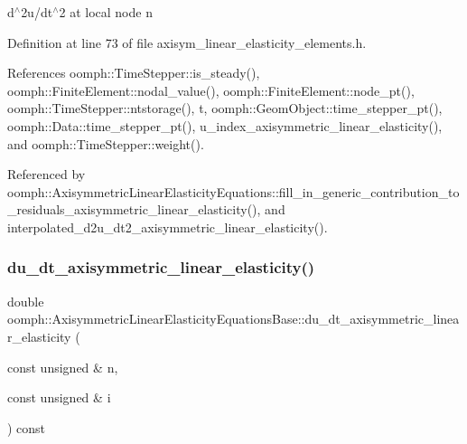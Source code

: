 d$^\wedge$2u/dt$^\wedge$2 at local node n 



Definition at line 73 of file axisym\+\_\+linear\+\_\+elasticity\+\_\+elements.\+h.



References oomph\+::\+Time\+Stepper\+::is\+\_\+steady(), oomph\+::\+Finite\+Element\+::nodal\+\_\+value(), oomph\+::\+Finite\+Element\+::node\+\_\+pt(), oomph\+::\+Time\+Stepper\+::ntstorage(), t, oomph\+::\+Geom\+Object\+::time\+\_\+stepper\+\_\+pt(), oomph\+::\+Data\+::time\+\_\+stepper\+\_\+pt(), u\+\_\+index\+\_\+axisymmetric\+\_\+linear\+\_\+elasticity(), and oomph\+::\+Time\+Stepper\+::weight().



Referenced by oomph\+::\+Axisymmetric\+Linear\+Elasticity\+Equations\+::fill\+\_\+in\+\_\+generic\+\_\+contribution\+\_\+to\+\_\+residuals\+\_\+axisymmetric\+\_\+linear\+\_\+elasticity(), and interpolated\+\_\+d2u\+\_\+dt2\+\_\+axisymmetric\+\_\+linear\+\_\+elasticity().

\mbox{\label{classoomph_1_1AxisymmetricLinearElasticityEquationsBase_aa340a3d1068cb5f65ebbfabf1bf07b1e}} 
\subsubsection{\texorpdfstring{du\+\_\+dt\+\_\+axisymmetric\+\_\+linear\+\_\+elasticity()}{du\_dt\_axisymmetric\_linear\_elasticity()}}
{\footnotesize\ttfamily double oomph\+::\+Axisymmetric\+Linear\+Elasticity\+Equations\+Base\+::du\+\_\+dt\+\_\+axisymmetric\+\_\+linear\+\_\+elasticity (\begin{DoxyParamCaption}\item[{const unsigned \&}]{n,  }\item[{const unsigned \&}]{i }\end{DoxyParamCaption}) const\hspace{0.3cm}{\ttfamily [inline]}}



